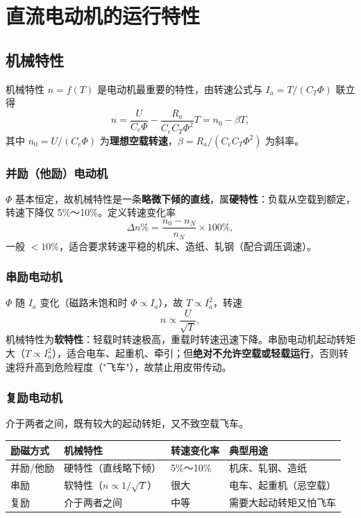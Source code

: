 \section{直流电动机的运行特性}

\subsection{机械特性}
机械特性 $n=f(T)$ 是电动机最重要的特性，由转速公式与 $I_a=T/(C_T\Phi)$ 联立得
\begin{equation}
n=\frac{U}{C_e\Phi}-\frac{R_a}{C_eC_T\Phi^{2}}T=n_0-\beta T ,
\end{equation}
其中 $n_0=U/(C_e\Phi)$ 为\textbf{理想空载转速}，$\beta=R_a/(C_eC_T\Phi^2)$ 为斜率。

\subsubsection{并励（他励）电动机}
$\Phi$ 基本恒定，故机械特性是一条\textbf{略微下倾的直线}，属\textbf{硬特性}：负载从空载到额定，转速下降仅 5\%～10\%。定义转速变化率
\begin{equation}
\Delta n\%=\frac{n_0-n_N}{n_N}\times100\% ,
\end{equation}
一般 $<10\%$，适合要求转速平稳的机床、造纸、轧钢（配合调压调速）。

\subsubsection{串励电动机}
$\Phi$ 随 $I_a$ 变化（磁路未饱和时 $\Phi\propto I_a$），故 $T\propto I_a^2$，转速
\begin{equation}
n\propto\frac{U}{\sqrt{T}} ,
\end{equation}
机械特性为\textbf{软特性}：轻载时转速极高，重载时转速迅速下降。串励电动机起动转矩大（$T\propto I_a^2$），适合电车、起重机、牵引；但\textbf{绝对不允许空载或轻载运行}，否则转速将升高到危险程度（"飞车"），故禁止用皮带传动。

\subsubsection{复励电动机}
介于两者之间，既有较大的起动转矩，又不致空载飞车。

\begin{center}
\begin{tabular}{@{}p{2.0cm}p{3.4cm}p{3.6cm}p{4.2cm}@{}}
\toprule
励磁方式 & 机械特性 & 转速变化率 & 典型用途 \\
\midrule
并励/他励 & 硬特性（直线略下倾） & 5\%～10\% & 机床、轧钢、造纸 \\
串励 & 软特性（$n\propto1/\sqrt T$） & 很大 & 电车、起重机（忌空载） \\
复励 & 介于两者之间 & 中等 & 需要大起动转矩又怕飞车 \\
\bottomrule
\end{tabular}
\end{center}

